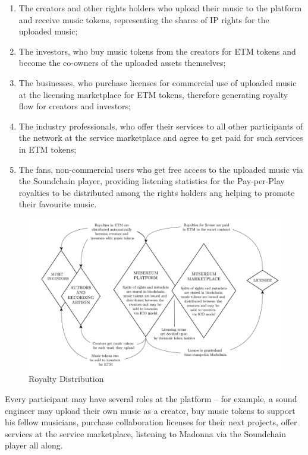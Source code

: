 \documentclass[12pt]{report}
\begin{document}
\begin{enumerate}
	\item The creators and other rights holders who upload their music to the platform and receive music tokens, representing the shares of IP rights for the uploaded music;
	\item The investors, who buy music tokens from the creators for ETM tokens and become the co-owners of the uploaded assets themselves;
	\item The businesses, who purchase licenses for commercial use of uploaded music at the licensing marketplace for ETM tokens, therefore generating royalty flow for creators and investors;
	\item The industry professionals, who offer their services to all other participants of the network at the service marketplace and agree to get paid for such services in ETM tokens;
	\item The fans, non-commercial users who get free access to the uploaded music via the Soundchain player, providing listening statistics for the Pay-per-Play royalties to be distributed among the rights holders ang helping to promote their favourite music.
\end{enumerate}

\begin{figure}[H] 
\centering
\caption{Royalty Distribution}
\vspace{20pt}
\includegraphics[width=\textwidth]{musereum-scheme}
\end{figure}
 
Every participant may have several roles at the platform – for example, a sound engineer may upload their own music as a creator, buy music tokens to support his fellow musicians, purchase collaboration licenses for their next projects, offer services at the service marketplace, listening to Madonna via the Soundchain player all along.
\end{document}

